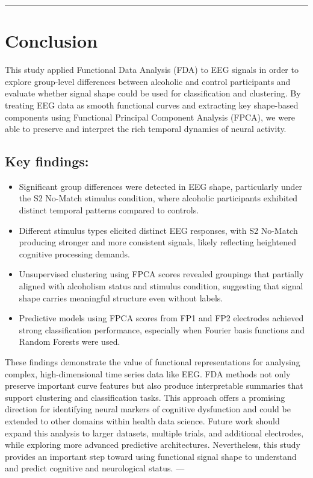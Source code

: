 \documentclass{article}
\begin{document}
\begin{center}\rule{0.5\linewidth}{0.5pt}\end{center}

\section{Conclusion}\label{conclusion}

This study applied Functional Data Analysis (FDA) to EEG signals in
order to explore group-level differences between alcoholic and control
participants and evaluate whether signal shape could be used for
classification and clustering. By treating EEG data as smooth functional
curves and extracting key shape-based components using Functional
Principal Component Analysis (FPCA), we were able to preserve and
interpret the rich temporal dynamics of neural activity.

\subsection{Key findings:}\label{key-findings-1}

\begin{itemize}
\item
  Significant group differences were detected in EEG shape, particularly
  under the S2 No-Match stimulus condition, where alcoholic participants
  exhibited distinct temporal patterns compared to controls.
\item
  Different stimulus types elicited distinct EEG responses, with S2
  No-Match producing stronger and more consistent signals, likely
  reflecting heightened cognitive processing demands.
\item
  Unsupervised clustering using FPCA scores revealed groupings that
  partially aligned with alcoholism status and stimulus condition,
  suggesting that signal shape carries meaningful structure even without
  labels.
\item
  Predictive models using FPCA scores from FP1 and FP2 electrodes
  achieved strong classification performance, especially when Fourier
  basis functions and Random Forests were used.
\end{itemize}

These findings demonstrate the value of functional representations for
analysing complex, high-dimensional time series data like EEG. FDA
methods not only preserve important curve features but also produce
interpretable summaries that support clustering and classification
tasks. This approach offers a promising direction for identifying neural
markers of cognitive dysfunction and could be extended to other domains
within health data science. Future work should expand this analysis to
larger datasets, multiple trials, and additional electrodes, while
exploring more advanced predictive architectures. Nevertheless, this
study provides an important step toward using functional signal shape to
understand and predict cognitive and neurological status. ---



\end{document}
